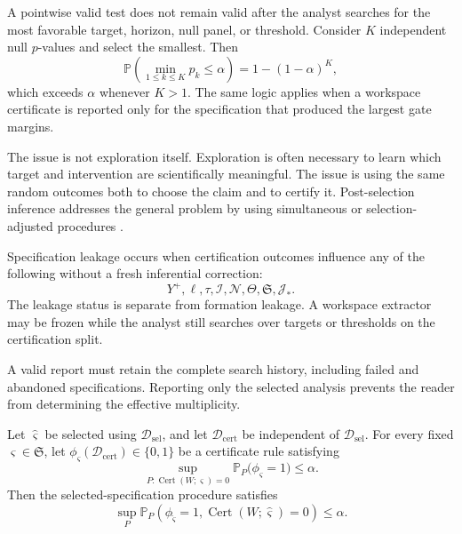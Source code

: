 
A pointwise valid test does not remain valid after the analyst searches for the
most favorable target, horizon, null panel, or threshold. Consider
\(K\) independent null \(p\)-values and select the smallest. Then
\[
\mathbb P\left(\min_{1\leq k\leq K}p_k\leq\alpha\right)
=
1-(1-\alpha)^K,
\]
which exceeds \(\alpha\) whenever \(K>1\). The same logic applies when a
workspace certificate is reported only for the specification that produced the
largest gate margins.

The issue is not exploration itself. Exploration is often necessary to learn
which target and intervention are scientifically meaningful. The issue is
using the same random outcomes both to choose the claim and to certify it.
Post-selection inference addresses the general problem by using simultaneous
or selection-adjusted procedures \cite{BerkEtAl2013}.


\begin{definition}
Specification leakage occurs when certification outcomes influence any of the
following without a fresh inferential correction:
\[
Y^+,
\ell,
\tau,
\mathcal I,
\mathcal N,
\Theta,
\mathfrak S,
\mathcal J_*.
\]
The leakage status is separate from formation leakage. A workspace extractor
may be frozen while the analyst still searches over targets or thresholds on
the certification split.
\end{definition}

A valid report must retain the complete search history, including failed and
abandoned specifications. Reporting only the selected analysis prevents the
reader from determining the effective multiplicity.


\begin{theorem}
\label{thm:sample-split-spec-selection}
Let \(\widehat\varsigma\) be selected using
\(\mathcal D_{\mathrm{sel}}\), and let
\(\mathcal D_{\mathrm{cert}}\) be independent of
\(\mathcal D_{\mathrm{sel}}\). For every fixed
\(\varsigma\in\mathfrak S\), let
\(\phi_\varsigma(\mathcal D_{\mathrm{cert}})\in\{0,1\}\) be a certificate
rule satisfying
\[
\sup_{P:\operatorname{Cert}(W;\varsigma)=0}
\mathbb P_P\bigl(\phi_\varsigma=1\bigr)
\leq\alpha.
\]
Then the selected-specification procedure satisfies
\[
\boxed{
\sup_P
\mathbb P_P\left(
\phi_{\widehat\varsigma}=1,
\operatorname{Cert}(W;\widehat\varsigma)=0
\right)
\leq\alpha.
}
\]
\end{theorem}

